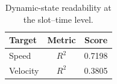 \begin{table}[t]
\centering
\caption{Dynamic-state readability at the slot--time level.}
\label{tab:dynamic-information}
\small
\begin{tabular}{@{}lcc@{}}
\toprule
\textbf{Target} & \textbf{Metric} & \textbf{Score} \\
\midrule
Speed & $R^2$ & 0.7198 \\
Velocity & $R^2$ & 0.3805 \\
\bottomrule
\end{tabular}
\end{table}
